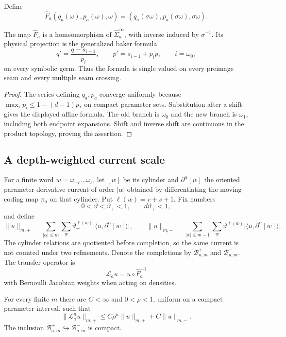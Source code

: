 Define
\[
 \widehat F_a(q_a(\omega),p_a(\omega),\omega)
 =(q_a(\sigma\omega),p_a(\sigma\omega),\sigma\omega).
\]

\begin{theorem}
\label{thm:r8-a1-bijection}
The map $\widehat F_a$ is a homeomorphism of
$\widehat\Sigma_a^\infty$, with inverse induced by $\sigma^{-1}$.  Its physical
projection is the generalized baker formula
\[
 q'=\frac{q-s_{i-1}}{p_i},\qquad p'=s_{i-1}+p_i p,
 \qquad i=\omega_0,
\]
on every symbolic germ.  Thus the formula is single valued on every preimage
seam and every multiple seam crossing.
\end{theorem}

\begin{proof}
The series defining $q_a,p_a$ converge uniformly because
$\max_i p_i\le1-(d-1)p_*$ on compact parameter sets.  Substitution after a
shift gives the displayed affine formula.  The old branch is $\omega_0$ and
the new branch is $\omega_1$, including both endpoint expansions.  Shift and
inverse shift are continuous in the product topology, proving the assertion.
\end{proof}

\subsection{A depth-weighted current scale}

For a finite word $w=\omega_{-r}\ldots\omega_s$, let $[w]$ be its cylinder and
$\partial^\alpha[w]$ the oriented parameter derivative current of order
$|\alpha|$ obtained by differentiating the moving coding map $\pi_a$ on that
cylinder.  Put $\ell(w)=r+s+1$.  Fix numbers
\[
 0<\vartheta<\vartheta_+<1,
 \qquad d\vartheta_+<1,
\]
and define
\[
 \|u\|_{m,+}=\sum_{|\alpha|\le m}
 \sum_w \vartheta_+^{\ell(w)}
 \bigl|\langle u,\partial^\alpha[w]\rangle\bigr|,
\qquad
 \|u\|_{m,-}=\sum_{|\alpha|\le m-1}
 \sum_w \vartheta^{\ell(w)}
 \bigl|\langle u,\partial^\alpha[w]\rangle\bigr|.
\]
The cylinder relations are quotiented before completion, so the same current
is not counted under two refinements.  Denote the completions by
$\mathscr B_{a,m}^+$ and $\mathscr B_{a,m}^-$.  The transfer operator is
\[
 \mathcal L_a u=u\circ\widehat F_a^{-1}
\]
with Bernoulli Jacobian weights when acting on densities.

\begin{lemma}
\label{lem:r8-a1-ly}
For every finite $m$ there are $C<\infty$ and $0<\rho<1$, uniform on a compact
parameter interval, such that
\[
 \|\mathcal L_a^n u\|_{m,+}
 \le C\rho^n\|u\|_{m,+}+C\|u\|_{m,-}.
\]
The inclusion $\mathscr B_{a,m}^+\hookrightarrow\mathscr B_{a,m}^-$ is compact.
\end{lemma}


